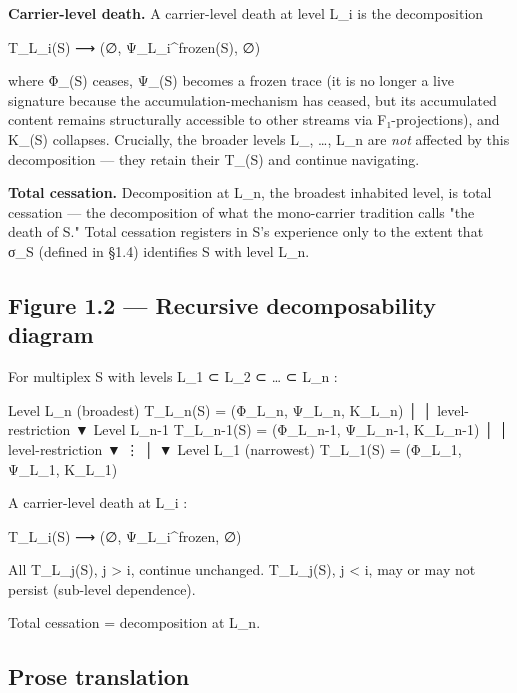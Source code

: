 \documentclass[11pt, openany]{book}
\begin{document}
\textbf{Carrier-level death.} A carrier-level death at level L\_\allowbreak{}i is the decomposition
\begin{Code}
T_{L_i}(S) ⟶ (∅, Ψ_{L_i}^frozen(S), ∅)
\end{Code}
where Φ\_(S) ceases, Ψ\_(S) becomes a frozen trace (it is no longer a live signature because the accumulation-mechanism has ceased, but its accumulated content remains structurally accessible to other streams via F₁-projections), and Κ\_(S) collapses. Crucially, the broader levels L\_, …, L\_\allowbreak{}n are \textit{not} affected by this decomposition --- they retain their T\_(S) and continue navigating.

\textbf{Total cessation.} Decomposition at L\_\allowbreak{}n, the broadest inhabited level, is total cessation --- the decomposition of what the mono-carrier tradition calls "the death of S." Total cessation registers in S's experience only to the extent that σ\_\allowbreak{}S (defined in §1.4) identifies S with level L\_\allowbreak{}n.

\subsection{Figure 1.2 --- Recursive decomposability diagram}

\begin{Code}
For multiplex S with levels L_1 ⊂ L_2 ⊂ … ⊂ L_n :

    Level L_n (broadest)      T_{L_n}(S) = (Φ_{L_n}, Ψ_{L_n}, Κ_{L_n})
         │
         │   level-restriction
         ▼
    Level L_{n-1}             T_{L_{n-1}}(S) = (Φ_{L_{n-1}}, Ψ_{L_{n-1}}, Κ_{L_{n-1}})
         │
         │   level-restriction
         ▼
         ⋮
         │
         ▼
    Level L_1 (narrowest)     T_{L_1}(S) = (Φ_{L_1}, Ψ_{L_1}, Κ_{L_1})


A carrier-level death at L_i :

    T_{L_i}(S) ⟶ (∅, Ψ_{L_i}^frozen, ∅)

    All T_{L_j}(S), j > i, continue unchanged.
    T_{L_j}(S), j < i, may or may not persist (sub-level dependence).

Total cessation = decomposition at L_n.
\end{Code}

\subsection{Prose translation}
\end{document}
